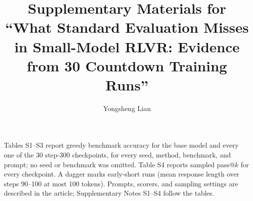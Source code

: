 \documentclass[11pt]{article}
\title{Supplementary Materials for ``What Standard Evaluation Misses in Small-Model RLVR: Evidence from 30 Countdown Training Runs''}
\author{Yongsheng Lian}
\date{}
\begin{document}
\maketitle
Tables S1--S3 report greedy benchmark accuracy for the base model and every one of the 30 step-300 checkpoints, for every seed, method, benchmark, and prompt; no seed or benchmark was omitted. Table S4 reports sampled pass@$k$ for every checkpoint. A dagger marks early-short runs (mean response length over steps 90--100 at most 100 tokens). Prompts, scorers, and sampling settings are described in the article; Supplementary Notes S1--S4 follow the tables.

\begin{table}[p]
\centering
\scriptsize
\caption{Flexible accuracy (\%) for the base model and all 30 step-300 checkpoints. Std. denotes the benchmark-specific standard prompt; Think denotes the Countdown-style think prompt. $^\dagger$Early-short run.}
\label{tab:matched_flexible_full}
\end{table}
\end{document}
